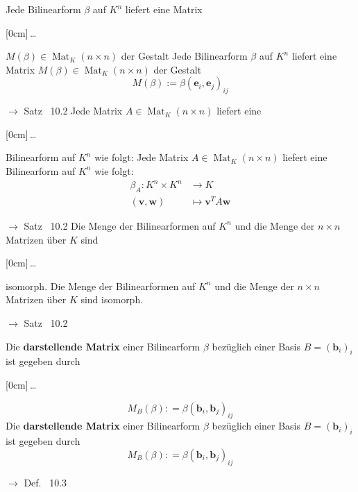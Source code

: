 \documentclass[11pt]{article}
\renewcommand{\cite}[1]{\par\bigskip\hfill{\color{gray}\tiny\(\to\) #1}}
\renewcommand{\vec}[1]{\mathbf{#1}}
\DeclareMathOperator{\Mat}{Mat}
\newcommand{\hide}[1]{\parbox{0cm}{\raisebox{-7pt}[0cm]{\dots}}\color{white}#1\color{black}}
\let\olddots\dots
\renewcommand{\dots}{\,\olddots\,}
\newenvironment{field}{}{\newpage}
\newif\ifnote
\newenvironment{note}{\notetrue}{\notefalse}
\newcommand{\localtag}{}
\newcommand{\globaltag}{}
\newcommand{\uuid}{}
\newcommand{\tags}[1]{
    \ifnote
        \renewcommand{\localtag}{#1}
    \else
        \renewcommand{\globaltag}{#1}
    \fi
    }
\newcommand{\xplain}[1]{\renewcommand{\uuid}{#1}}
\begin{document}
\begin{note}
    \tags{Satz}
    \xplain{d607e83e-b98f-11ec-8422-0242ac120002}
    \begin{field}
    Jede Bilinearform \(\beta\) auf \(K^n\) liefert eine Matrix \hide{\(M(\beta)\in \Mat_K(n\times n)\) der Gestalt}
    \end{field}
    \begin{field}
    Jede Bilinearform \(\beta\) auf \(K^n\) liefert eine Matrix \(M(\beta)\in \Mat_K(n\times n)\) der Gestalt
    \[M(\beta) := \beta(\vec{e}_i, \vec{e}_j)_{ij}\] \cite{Satz ~10.2}
    \end{field}
    \begin{field}
    Jede Matrix \(A\in\Mat_K(n\times n)\) liefert eine \hide{Bilinearform auf \(K^n\)} wie folgt:
    \end{field}
    \begin{field}
    Jede Matrix \(A\in\Mat_K(n\times n)\) liefert eine Bilinearform auf \(K^n\) wie folgt:
    \begin{align*}
    \beta_A: K^n\times K^n &\longrightarrow K \\
    (\vec{v}, \vec{w}) &\mapsto \vec{v}^T A \vec{w}
    \end{align*}
    \cite{Satz ~10.2}
    \end{field}
    \begin{field}
    Die Menge der Bilinearformen auf \(K^n\) und die Menge der \(n\times n\) Matrizen über \(K\) sind \hide{isomorph}.
    \end{field}
    \begin{field}
    Die Menge der Bilinearformen auf \(K^n\) und die Menge der \(n\times n\) Matrizen über \(K\) sind isomorph.
    \cite{Satz ~10.2}
    \end{field}
\end{note}

\begin{note}
    \tags{Def}
    \xplain{51387522-ba4a-11ec-8422-0242ac120002}
    \begin{field}
    Die \textbf{darstellende Matrix} einer Bilinearform \(\beta\) bezüglich einer Basis \(B=(\vec{b}_i)_i\) ist gegeben durch \hide{\[M_B(\beta)\colon = \beta(\vec{b}_i, \vec{b}_j)_{ij}\]}
    \end{field}
    \begin{field}
    Die \textbf{darstellende Matrix} einer Bilinearform \(\beta\) bezüglich einer Basis \(B=(\vec{b}_i)_i\) ist gegeben durch
    \[M_B(\beta)\colon = \beta(\vec{b}_i, \vec{b}_j)_{ij}\]
    \cite{Def. ~10.3}
    \end{field}
\end{note}
\end{document}
